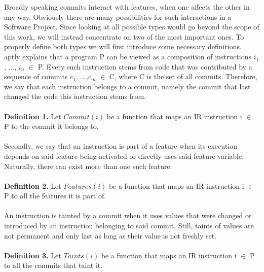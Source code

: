 Broadly speaking commits interact with features, when one affects the other in any way.
Obviously there are many possibilities for such interactions in a Software Project.
Since looking at all possible types would go beyond the scope of this work, we will instead concentrate on two of the most important ones.
To properly define both types we will first introduce some necessary definitions. \\
\citet{sattler2023seal} aptly explains that a program P can be viewed as a composition of instructions $i_1$, ..., $i_n$ $\in$ P.
Every such instruction stems from code that was contributed by a sequence of commits $c_1$, ...,$c_m$ $\in$ C, where C is the set of all commits.
Therefore, we say that each instruction belongs to a commit, namely the commit that last changed the code this instruction stems from. \\ \\
\textbf{Definition 1.} Let $Commit(i)$ be a function that maps an IR instruction i $\in$ P to the commit it belongs to. \\ \\
Secondly, we say that an instruction is part of a feature when its execution depends on said feature being activated or directly uses said feature variable. 
Naturally, there can exist more than one such feature. \\ \\
\textbf{Definition 2.} Let $Features(i)$ be a function that maps an IR instruction i $\in$ P to all the features it is part of. \\ \\
An instruction is tainted by a commit when it uses values that were changed or introduced by an instruction belonging to said commit. 
Still, taints of values are not permanent and only last as long as their value is not freshly set. \\ \\
\textbf{Definition 3.} Let $Taints(i)$ be a function that maps an IR instruction i $\in$ P to all the commits that taint it. \\ \\ \\

